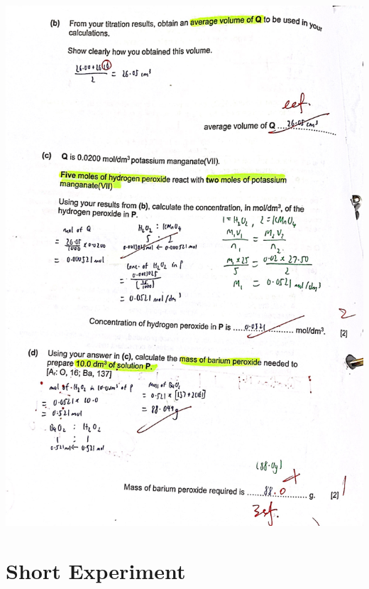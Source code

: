 \documentclass[oneside]{book}
\begin{document}
\begin{center}
        \includegraphics[width=\textwidth,height=\textheight,keepaspectratio]{images/4369A5A1-83B5-4492-8347-CC184A675AD3.jpeg}
\end{center}
\newpage
\section{Short Experiment}
\end{document}
